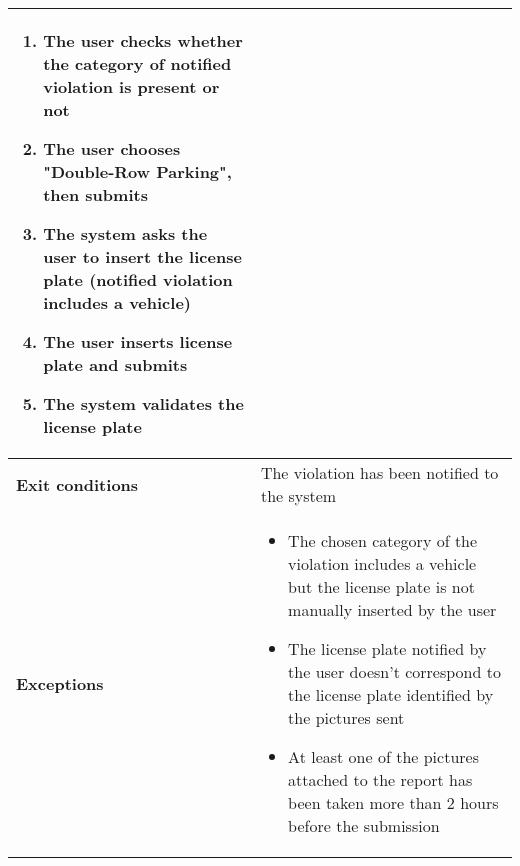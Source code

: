 \begin{description}
\begin{center}
\begin{tabular}{|p{3cm}|p{7cm}|}
\begin{enumerate}
                \item The user checks whether the category of notified violation is present or not
                \item The user chooses "Double-Row Parking", then submits
                \item The system asks the user to insert the license plate (notified violation includes a vehicle) 
                \item The user inserts license plate and submits 
                \item The system validates the license plate
            \end{enumerate} \\
            \hline
            \textbf{Exit conditions} & The violation has been notified to the system \\
            \hline
            \textbf{Exceptions}
            & \begin{itemize}
                \item The chosen category of the violation includes a vehicle but the license plate is not manually inserted by the user
                \item The license plate notified by the user doesn't correspond to the license plate identified by the pictures sent 
                \item At least one of the pictures attached to the report has been taken more than 2 hours before the submission 
            \end{itemize} \\
            \hline
        \end{tabular}
    \end{center}
\end{description}


